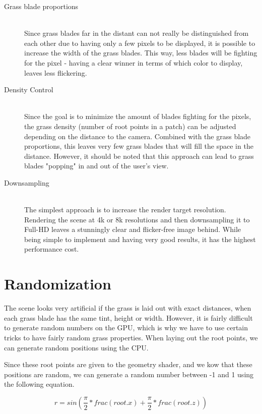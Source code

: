 \documentclass[conference]{acmsiggraph}
\begin{document}
\begin{description}
  \item[Grass blade proportions] \hfill \\
  Since grass blades far in the distant can not really be distinguished from each other due to having only a few pixels to be displayed, it is possible to increase the width of the grass blades. This way, less blades will be fighting for the pixel - having a clear winner in terms of which color to display, leaves less flickering.
  \item[Density Control] \hfill \\
  Since the goal is to minimize the amount of blades fighting for the pixels, the grass density (number of root points in a patch) can be adjusted depending on the distance to the camera. Combined with the grass blade proportions, this leaves very few grass blades that will fill the space in the distance. However, it should be noted that this approach can lead to grass blades "popping" in and out of the user's view.
  \item[Downsampling] \hfill \\
  The simplest approach is to increase the render target resolution. Rendering the scene at 4k or 8k resolutions and then downsampling it to Full-HD leaves a stunningly clear and flicker-free image behind. While being simple to implement and having very good results, it has the highest performance cost. 
\end{description}

\section{Randomization}

The scene looks very artificial if the grass is laid out with exact distances, when each grass blade has the same tint, height or width. However, it is fairly difficult to generate random numbers on the GPU, which is why we have to use certain tricks to have fairly random grass properties. When laying out the root points, we can generate random positions using the CPU.

Since these root points are given to the geometry shader, and we kow that these positions are random, we can generate a random number between -1 and 1 using the following equation.

\begin{equation}
r = sin(\frac{\pi}2 * frac(root.x) + \frac{\pi}2 * frac(root.z))
\end{equation}
\end{document}
